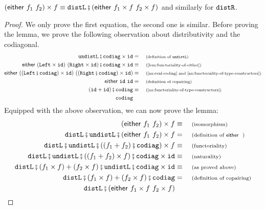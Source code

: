 \begin{lemma}\label{lem:distributivity-of-either}
    $(\either {f_1}  {f_2}) \times f \equiv \distlterm\comp (\either {f_1 \times f} {f_2 \times f})$ and similarly for $\mathtt{distR}$.
\end{lemma}
\begin{proof} We only prove the first equation, the second one is similar.
Before proving the lemma, we prove the following observation about distributivity and the codiagonal.
    \begin{align*}
    \undistlterm\comp  \codiagterm \times \idterm &= \why{definition of $\undistlterm$}\\
\either {(\leftterm \times \idterm)} {(\rightterm \times \idterm)}\comp  \codiagterm \times \idterm \equalbecause{\cref{lem:functoriality-of-either}}\\
\either {((\leftterm\comp\codiagterm) \times \idterm)} {((\rightterm\comp\codiagterm) \times \idterm)} \equalbecause{\cref{ax:eval-codiag} and \cref{ax:functoriality-of-type-constructors}}\\ 
\either{\idterm} {\idterm}  &= \why{definition of copairing}\\ 
(\idterm + \idterm)\comp \codiagterm  \equalbecause{\cref{ax:functoriality-of-type-constructors}}\\
\codiagterm
    \end{align*}
Equipped with the above observation, we can now prove the lemma:
    \begin{align*}
    (\either{f_1}{f_2}) \times f  \equalbecause{isomorphism} \\
    \distlterm\comp \undistlterm\comp (\either{f_1}{f_2}) \times f &= \why{definition of $\either{ }{ }$}\\
        \distlterm\comp \undistlterm\comp ((f_1 + f_2)\comp\codiagterm) \times f \equalbecause{functoriality}\\
                \distlterm\comp \undistlterm\comp ((f_1 + f_2) \times f)\comp \codiagterm \times \idterm \equalbecause{naturality}\\
                \distlterm\comp (f_1 \times f) + (f_2 \times f)\comp \undistlterm\comp  \codiagterm \times \idterm \equalbecause{as proved above}\\
            \distlterm\comp (f_1 \times f) + (f_2 \times f)\comp \codiagterm &= \why{definition of copairing}\\ 
            \distlterm\comp (\either {f_1 \times f} {f_2 \times f})
            \end{align*}
\end{proof}
